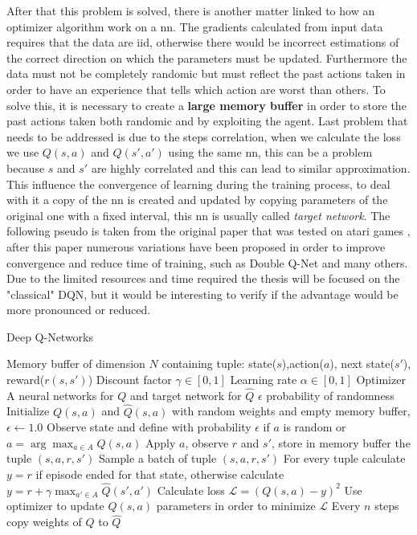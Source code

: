After that this problem is solved, there is another matter linked to how an optimizer algorithm work on a \acrshort{nn}. The gradients calculated from input data requires that the data are \acrshort{iid}, otherwise there would be incorrect estimations of the correct direction on which the parameters must be updated. Furthermore the data must not be completely randomic but must reflect the past actions taken in order to have an experience that tells which action are worst than others. To solve this, it is necessary to create a \textbf{large memory buffer} in order to store the past actions taken both randomic and by exploiting the agent.
Last problem that needs to be addressed is due to the steps correlation, when we calculate the loss we use $Q(s,a)$ and $Q(s',a')$ using the same \acrshort{nn}, this can be a problem because $s$ and $s'$ are highly correlated and this can lead to similar approximation. This influence the convergence of learning during the training process, to deal with it a copy of the \acrshort{nn} is created and updated by copying parameters of the original one with a fixed interval, this \acrshort{nn} is usually called \textit{target network}.
The following pseudo is taken from the original paper that was tested on atari games \cite{DBLP:journals/corr/MnihKSGAWR13}, after this paper numerous variations have been proposed in order to improve convergence and reduce time of training, such as Double Q-Net \cite{DBLP:journals/corr/HasseltGS15} and many others. Due to the limited resources and time required the thesis will be focused on the "classical" DQN, but it would be interesting to verify if the advantage would be more pronounced or reduced.
\begin{algorithm} \label{DQN}
	\caption{Deep Q-Networks}
	\begin{algorithmic}
	\REQUIRE Memory buffer of dimension $N$ containing tuple: state($s$),action($a$), next state($s'$), reward($r(s,s')$)
	\REQUIRE Discount factor $\gamma \in [0,1]$
	\REQUIRE Learning rate  $\alpha \in  [0,1]$
	\REQUIRE Optimizer
	\REQUIRE A neural networks for $Q$ and target network for $\hat{Q}$
	\REQUIRE $\epsilon$ probability of randomness
	\STATE Initialize $Q(s,a)$ and $\hat{Q}(s,a)$ with random weights and empty memory buffer, $\epsilon \leftarrow 1.0$
	\STATE Observe state and define with probability $\epsilon$ if $a$ is random or $a = \arg \max_{a \in A} Q(s,a)$
	\STATE Apply $a$, observe $r$ and $s'$, store in memory buffer the tuple $(s,a,r,s')$
	\STATE Sample a batch of tuple $(s,a,r,s')$
	\STATE For every tuple calculate $y = r$ if episode ended for that state, otherwise calculate $y = r + \gamma \max_{a' \in A} \hat{Q}(s',a')$
	\STATE Calculate loss $\mathcal{L} = (Q(s,a) - y)^2$
	\STATE Use optimizer to update $Q(s,a)$ parameters in order to minimize $\mathcal{L}$ 
	\STATE Every $n$ steps copy weights of $Q$ to $\hat{Q}$
	\ENDWHILE		
	\end{algorithmic}
\end{algorithm}\\
